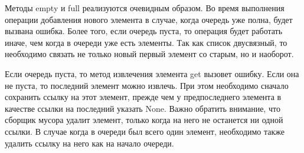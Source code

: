 \documentclass[a4paper, fleqn]{article}
\begin{document}
Методы empty и full реализуются очевидным образом.
Во время выполнения операции добавления нового элемента в случае, когда очередь уже полна, будет вызвана ошибка. Более того, если очередь пуста, то операция будет работать иначе, чем когда в очереди уже есть элементы. Так как список двусвязный, то необходимо связать не только новый первый элемент со старым, но и наоборот.

Если очередь пуста, то метод извлечения элемента get вызовет ошибку. Если она не пуста, то последний элемент можно извлечь. При этом необходимо сначало сохранить ссылку на этот элемент, прежде чем у предпоследнего элемента в качестве ссылки на последний указать None. Важно обратить внимание, что сборщик мусора удалит элемент, только когда на него не останется ни одной ссылки. В случае когда в очереди был всего один элемент, необходимо также удалить ссылку на него как на начало очереди.
\end{document}
